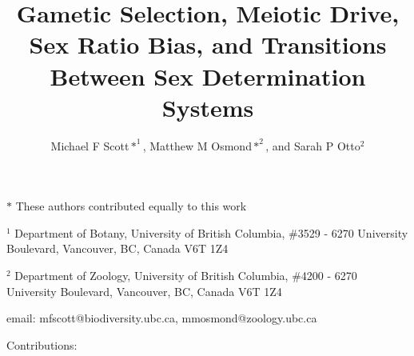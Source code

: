 \documentclass[12pt]{article}
\begin{document}
\title{Gametic Selection, Meiotic Drive, Sex Ratio Bias, and Transitions Between Sex Determination Systems}
\author{Michael F Scott$*^1$, Matthew M Osmond$*^2$, and Sarah P Otto$^2$}
\date{}
\maketitle
\noindent
$*$ These authors contributed equally to this work

\noindent
$^1$ Department of Botany, University of British Columbia, \#3529 - 6270 University Boulevard, Vancouver, BC, Canada V6T 1Z4

\noindent
$^2$ Department of Zoology, University of British Columbia, \#4200 - 6270 University Boulevard, Vancouver, BC, Canada V6T 1Z4

\noindent
email: mfscott@biodiversity.ubc.ca, mmosmond@zoology.ubc.ca

\noindent
Contributions: 

\newpage
\linenumbers
\modulolinenumbers[2]
\end{document}
